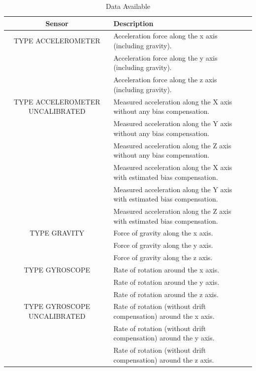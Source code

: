 \documentclass{UoNMCHA}
\numberwithin{equation}{section}
\begin{document}
\begin{table}[h!]
    \begin{center}
        \caption{Data Available\cite{androidMotionsensors}}\label{tab:AndroidDataAvailable}
        {\footnotesize
            \begin{tabular}{c l l l|}
                \hline\hline Sensor & Description \\ \hline 
                TYPE ACCELEROMETER & Acceleration force along the x axis (including gravity). \\
                 & Acceleration force along the y axis (including gravity). \\
                  & Acceleration force along the z axis (including gravity). \\
                TYPE ACCELEROMETER UNCALIBRATED & Measured acceleration along the X axis without any bias compensation. \\
                  & Measured acceleration along the Y axis without any bias compensation. \\
                  & Measured acceleration along the Z axis without any bias compensation. \\
                  & Measured acceleration along the X axis with estimated bias compensation. \\
                  & Measured acceleration along the Y axis with estimated bias compensation. \\
                  & Measured acceleration along the Z axis with estimated bias compensation. \\
                TYPE GRAVITY & Force of gravity along the x axis. \\
                 & Force of gravity along the y axis. \\
                 & Force of gravity along the z axis. \\
                TYPE GYROSCOPE & Rate of rotation around the x axis. \\
                  & Rate of rotation around the y axis. \\
                  & Rate of rotation around the z axis. \\
                TYPE GYROSCOPE UNCALIBRATED & Rate of rotation (without drift compensation) around the x axis. \\
                  & Rate of rotation (without drift compensation) around the y axis. \\
                  & Rate of rotation (without drift compensation) around the z axis. \\

\end{tabular}}
\end{center}
\end{table}
\end{document}
